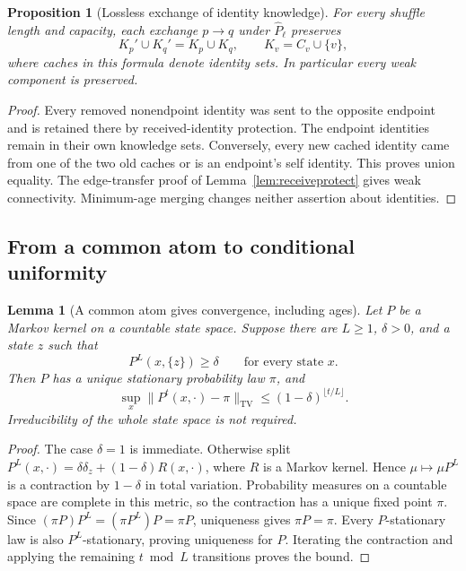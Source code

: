 \documentclass[11pt]{article}
\newtheorem{lemma}[theorem]{Lemma}
\newtheorem{proposition}[theorem]{Proposition}
\newcommand{\TV}{\mathrm{TV}}
\begin{document}
\begin{proposition}[Lossless exchange of identity knowledge]
\label{prop:thesisunion}
For every shuffle length and capacity, each exchange $p\to q$
under $\widehat P_\ell$ preserves
\[
 K_p'\cup K_q'=K_p\cup K_q,\qquad K_v=C_v\cup\{v\},
\]
where caches in this formula denote identity sets.
In particular every weak component is preserved.
\end{proposition}
\begin{proof}
Every removed nonendpoint identity was sent to the opposite
endpoint and is retained there by received-identity protection.
The endpoint identities remain in their own knowledge sets.
Conversely, every new cached identity came from one of the
two old caches or is an endpoint's self identity.
This proves union equality. The edge-transfer proof of
Lemma~\ref{lem:receiveprotect} gives weak connectivity.
Minimum-age merging changes neither assertion about identities.
\end{proof}

\subsection{From a common atom to conditional uniformity}

\begin{lemma}[A common atom gives convergence, including ages]
\label{lem:atom}
Let $P$ be a Markov kernel on a countable state space. Suppose there
are $L\ge1$, $\delta>0$, and a state $z$ such that
\[
 P^L(x,\{z\})\ge\delta\qquad\text{for every state }x.
\]
Then $P$ has a unique stationary probability law $\pi$, and
\[
 \sup_x\|P^t(x,\cdot)-\pi\|_{\TV}
 \le(1-\delta)^{\lfloor t/L\rfloor}.
\]
Irreducibility of the whole state space is not required.
\end{lemma}
\begin{proof}
The case $\delta=1$ is immediate. Otherwise split
$P^L(x,\cdot)=\delta\delta_z+(1-\delta)R(x,\cdot)$, where $R$ is a
Markov kernel. Hence $\mu\mapsto\mu P^L$ is a contraction by
$1-\delta$ in total variation. Probability measures on a countable
space are complete in this metric, so the contraction has a unique
fixed point $\pi$. Since
$(\pi P)P^L=(\pi P^L)P=\pi P$, uniqueness gives $\pi P=\pi$.
Every $P$-stationary law is also $P^L$-stationary, proving uniqueness
for $P$. Iterating the contraction and applying the remaining
$t\bmod L$ transitions proves the bound.
\end{proof}
\end{document}
